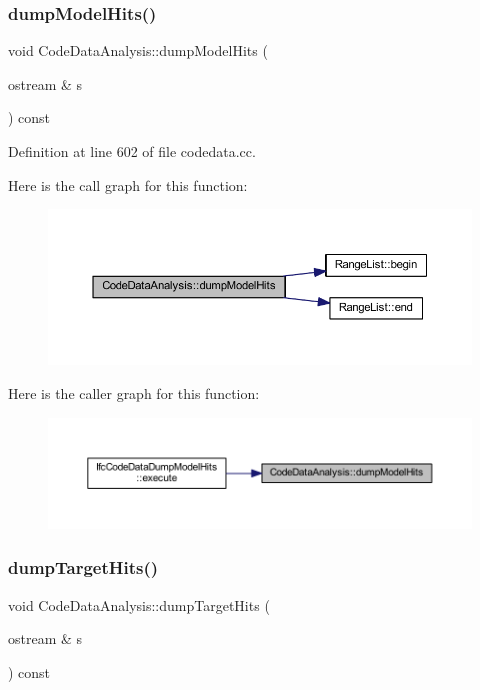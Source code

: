 \subsubsection{\texorpdfstring{dumpModelHits()}{dumpModelHits()}}
{\footnotesize\ttfamily void Code\+Data\+Analysis\+::dump\+Model\+Hits (\begin{DoxyParamCaption}\item[{ostream \&}]{s }\end{DoxyParamCaption}) const}



Definition at line 602 of file codedata.\+cc.

Here is the call graph for this function\+:
\nopagebreak
\begin{figure}[H]
\begin{center}
\leavevmode
\includegraphics[width=350pt]{class_code_data_analysis_a6bbc01214c5235583b79a2e9f014bfbf_cgraph}
\end{center}
\end{figure}
Here is the caller graph for this function\+:
\nopagebreak
\begin{figure}[H]
\begin{center}
\leavevmode
\includegraphics[width=350pt]{class_code_data_analysis_a6bbc01214c5235583b79a2e9f014bfbf_icgraph}
\end{center}
\end{figure}
\mbox{\label{class_code_data_analysis_af1e3bf0ac6da27639cfcd8cb22f931d6}} 
\subsubsection{\texorpdfstring{dumpTargetHits()}{dumpTargetHits()}}
{\footnotesize\ttfamily void Code\+Data\+Analysis\+::dump\+Target\+Hits (\begin{DoxyParamCaption}\item[{ostream \&}]{s }\end{DoxyParamCaption}) const}



